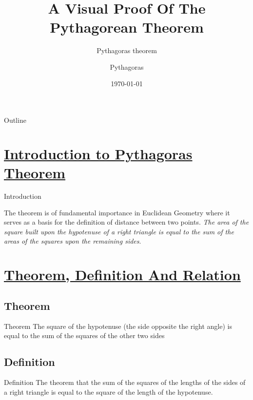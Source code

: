 \documentclass[10pt]{beamer}
\title[Pythagroras theorem 1]{A Visual Proof Of The Pythagorean Theorem}
\subtitle{Pythagoras theorem}
\author[Pythagoras of Samos]{Pythagoras}
\date{\today}
\begin{document}
\begin{frame}
	\titlepage			%
\end{frame}

\begin{frame}{Outline}
	\tableofcontents
\end{frame}

\section{\underline{Introduction to Pythagoras Theorem}}

\begin{frame}{Introduction}
\label{sec:intro}


The theorem is of fundamental importance in Euclidean Geometry where it serves 
as a basis for the definition of distance between two points.
\emph{The area of the square built upon the hypotenuse of a right
triangle is equal to the sum of the areas of the squares upon the
remaining sides}.
\end{frame}

\section{\underline{Theorem, Definition And Relation}}
\label{sec:def}
\subsection{Theorem}
\begin{frame}{Theorem}
The square of the hypotenuse (the side opposite the right angle) is equal to the sum of the squares of the other two sides
\end{frame}

\subsection{Definition}
\begin{frame}{Definition}
The theorem that the sum of the squares of the lengths of the sides of a right triangle is equal to the square of the length of the hypotenuse.
\end{frame}
\end{document}
